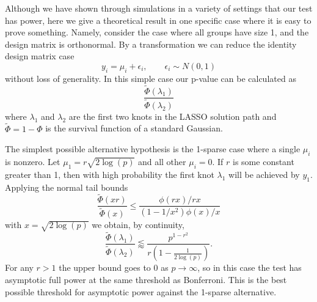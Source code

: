 \documentclass{imsart}
\begin{document}
Although we have shown through simulations in a variety of settings that
our test has power, here we give a theoretical result in one specific case
where it is easy to prove something. Namely, consider the case where all
groups have size 1, and the design matrix is orthonormal. By a
transformation we can reduce the identity design matrix case
\[
y_i = \mu_i + \epsilon_i, \qquad \epsilon_i \sim N(0,1)
\]
without loss of generality. In this simple case our p-value can be
calculated as
\[
\frac{\tilde \Phi(\lambda_1)}{\tilde \Phi(\lambda_2)}
\]
where $\lambda_1$ and $\lambda_2$ are the first two knots in the LASSO
solution path and $\tilde \Phi = 1 - \Phi$ is the survival function of
a standard Gaussian. 


The simplest possible alternative hypothesis
is the 1-sparse case where a single $\mu_i$ is nonzero. Let
$\mu_1 = r \sqrt{2\log(p)}$ and all other $\mu_i = 0$. If $r$ is some
constant greater than 1, then with high probability the first
knot $\lambda_1$ will be achieved by $y_1$. 
Applying the normal tail bounds
\[
\frac{\tilde \Phi(xr)}
{\tilde\Phi(x)} \leq \frac{\phi(rx)/rx}{(1-1/x^2)\phi(x)/x}
\]
with $x = \sqrt{2\log(p)}$ we obtain, by continuity,
\[
 \frac{\tilde \Phi(\lambda_1)}{\tilde \Phi(\lambda_2)}
\lessapprox \frac{p^{1-r^2}}{r\left(1-\frac{1}{2\log(p)}\right)}.
\]
For any $r > 1$ the upper bound goes to 0 as $p \to \infty$, so
in this case the test has asymptotic full power at the same threshold
as Bonferroni. This is the best possible threshold for asymptotic power
against the 1-sparse alternative.
\end{document}
